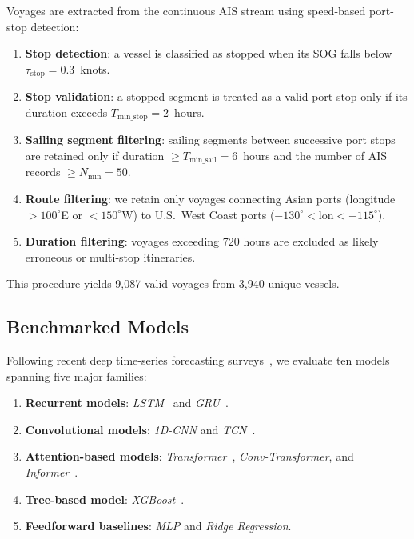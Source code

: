 \documentclass[conference]{IEEEtran}
\begin{document}
Voyages are extracted from the continuous AIS stream using speed-based port-stop detection:
\begin{enumerate}
    \item \textbf{Stop detection}: a vessel is classified as stopped when its SOG falls below $\tau_{\text{stop}} = 0.3$~knots.
    \item \textbf{Stop validation}: a stopped segment is treated as a valid port stop only if its duration exceeds $T_{\text{min\_stop}} = 2$~hours.
    \item \textbf{Sailing segment filtering}: sailing segments between successive port stops are retained only if duration $\geq T_{\text{min\_sail}} = 6$~hours and the number of AIS records $\geq N_{\text{min}} = 50$.
    \item \textbf{Route filtering}: we retain only voyages connecting Asian ports (longitude $> 100^\circ$E or $< 150^\circ$W) to U.S.\ West Coast ports ($-130^\circ < \text{lon} < -115^\circ$).
    \item \textbf{Duration filtering}: voyages exceeding 720 hours are excluded as likely erroneous or multi-stop itineraries.
\end{enumerate}
This procedure yields 9,087 valid voyages from 3,940 unique vessels.

\subsection{Benchmarked Models}
\label{sec:model_selection}
Following recent deep time-series forecasting surveys~\cite{kim2025comprehensive, zeng2023transformers}, we evaluate ten models spanning five major families:
\begin{enumerate}
    \item \textbf{Recurrent models}: \textit{LSTM}~\cite{hochreiter1997lstm} and \textit{GRU}~\cite{cho2014gru}.
    \item \textbf{Convolutional models}: \textit{1D-CNN} and \textit{TCN}~\cite{bai2018tcn}.
    \item \textbf{Attention-based models}: \textit{Transformer}~\cite{vaswani2017attention}, \textit{Conv-Transformer}, and \textit{Informer}~\cite{zhou2021informer}.
    \item \textbf{Tree-based model}: \textit{XGBoost}~\cite{chen2016xgboost}.
    \item \textbf{Feedforward baselines}: \textit{MLP} and \textit{Ridge Regression}.
\end{enumerate}
\end{document}
